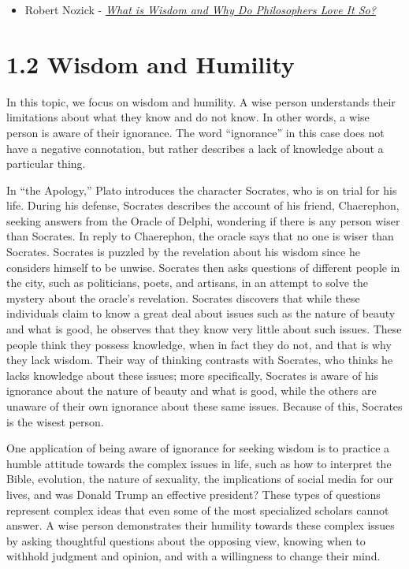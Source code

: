 \documentclass[
]{book}
\providecommand{\tightlist}{%
  \setlength{\itemsep}{0pt}\setlength{\parskip}{0pt}}
\begin{document}
\begin{itemize}
\tightlist
\item
  Robert Nozick - \href{assets/u1/PHIL-100-Nozick-What-is-Wisdom.pdf}{\emph{What is Wisdom and Why Do Philosophers Love It So?}}
\end{itemize}

\hypertarget{wisdom-and-humility}{%
\section*{1.2 Wisdom and Humility}\label{wisdom-and-humility}}

In this topic, we focus on wisdom and humility. A wise person understands their limitations about what they know and do not know. In other words, a wise person is aware of their ignorance. The word ``ignorance'' in this case does not have a negative connotation, but rather describes a lack of knowledge about a particular thing.

In ``the Apology,'' Plato introduces the character Socrates, who is on trial for his life. During his defense, Socrates describes the account of his friend, Chaerephon, seeking answers from the Oracle of Delphi, wondering if there is any person wiser than Socrates. In reply to Chaerephon, the oracle says that no one is wiser than Socrates. Socrates is puzzled by the revelation about his wisdom since he considers himself to be unwise. Socrates then asks questions of different people in the city, such as politicians, poets, and artisans, in an attempt to solve the mystery about the oracle's revelation. Socrates discovers that while these individuals claim to know a great deal about issues such as the nature of beauty and what is good, he observes that they know very little about such issues. These people think they possess knowledge, when in fact they do not, and that is why they lack wisdom. Their way of thinking contrasts with Socrates, who thinks he lacks knowledge about these issues; more specifically, Socrates is aware of his ignorance about the nature of beauty and what is good, while the others are unaware of their own ignorance about these same issues. Because of this, Socrates is the wisest person.

One application of being aware of ignorance for seeking wisdom is to practice a humble attitude towards the complex issues in life, such as how to interpret the Bible, evolution, the nature of sexuality, the implications of social media for our lives, and was Donald Trump an effective president? These types of questions represent complex ideas that even some of the most specialized scholars cannot answer. A wise person demonstrates their humility towards these complex issues by asking thoughtful questions about the opposing view, knowing when to withhold judgment and opinion, and with a willingness to change their mind.
\end{document}
